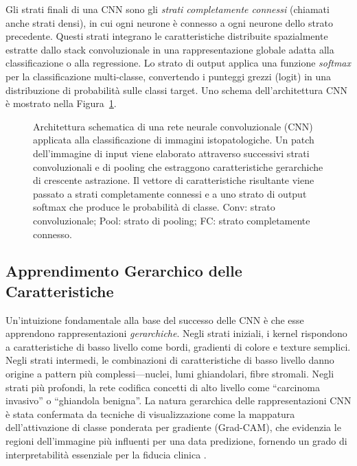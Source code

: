 Gli strati finali di una CNN sono gli \emph{strati completamente connessi} (chiamati anche strati densi), in cui ogni neurone è connesso a ogni neurone dello strato precedente. Questi strati integrano le caratteristiche distribuite spazialmente estratte dallo stack convoluzionale in una rappresentazione globale adatta alla classificazione o alla regressione. Lo strato di output applica una funzione \emph{softmax} per la classificazione multi-classe, convertendo i punteggi grezzi (logit) in una distribuzione di probabilità sulle classi target. Uno schema dell'architettura CNN è mostrato nella Figura~\ref{fig:cnn_arch}.

\begin{figure}[htbp]
  \centering
  
  \caption{Architettura schematica di una rete neurale convoluzionale (CNN) applicata alla classificazione di immagini istopatologiche. Un patch dell'immagine di input viene elaborato attraverso successivi strati convoluzionali e di pooling che estraggono caratteristiche gerarchiche di crescente astrazione. Il vettore di caratteristiche risultante viene passato a strati completamente connessi e a uno strato di output softmax che produce le probabilità di classe. Conv: strato convoluzionale; Pool: strato di pooling; FC: strato completamente connesso.}
  \label{fig:cnn_arch}
\end{figure}

\subsection{Apprendimento Gerarchico delle Caratteristiche}

Un'intuizione fondamentale alla base del successo delle CNN è che esse apprendono rappresentazioni \emph{gerarchiche}. Negli strati iniziali, i kernel rispondono a caratteristiche di basso livello come bordi, gradienti di colore e texture semplici. Negli strati intermedi, le combinazioni di caratteristiche di basso livello danno origine a pattern più complessi---nuclei, lumi ghiandolari, fibre stromali. Negli strati più profondi, la rete codifica concetti di alto livello come ``carcinoma invasivo'' o ``ghiandola benigna''. La natura gerarchica delle rappresentazioni CNN è stata confermata da tecniche di visualizzazione come la mappatura dell'attivazione di classe ponderata per gradiente (Grad-CAM), che evidenzia le regioni dell'immagine più influenti per una data predizione, fornendo un grado di interpretabilità essenziale per la fiducia clinica \cite{song2023}.

